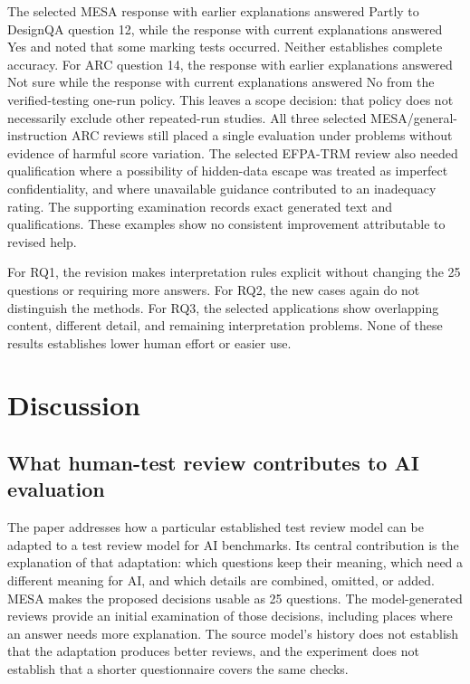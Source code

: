 \documentclass[10pt,conference]{IEEEtran}
\begin{document}
The selected MESA response with earlier explanations answered Partly to DesignQA question 12, while the response with current explanations answered Yes and noted that some marking tests occurred. Neither establishes complete accuracy. For ARC question 14, the response with earlier explanations answered Not sure while the response with current explanations answered No from the verified-testing one-run policy. This leaves a scope decision: that policy does not necessarily exclude other repeated-run studies. All three selected MESA/general-instruction ARC reviews still placed a single evaluation under problems without evidence of harmful score variation. The selected EFPA-TRM review also needed qualification where a possibility of hidden-data escape was treated as imperfect confidentiality, and where unavailable guidance contributed to an inadequacy rating. The supporting examination records exact generated text and qualifications. These examples show no consistent improvement attributable to revised help.

For RQ1, the revision makes interpretation rules explicit without changing the 25 questions or requiring more answers. For RQ2, the new cases again do not distinguish the methods. For RQ3, the selected applications show overlapping content, different detail, and remaining interpretation problems. None of these results establishes lower human effort or easier use.

\section{Discussion}
\subsection{What human-test review contributes to AI evaluation}
The paper addresses how a particular established test review model can be adapted to a test review model for AI benchmarks. Its central contribution is the explanation of that adaptation: which questions keep their meaning, which need a different meaning for AI, and which details are combined, omitted, or added. MESA makes the proposed decisions usable as 25 questions. The model-generated reviews provide an initial examination of those decisions, including places where an answer needs more explanation. The source model's history does not establish that the adaptation produces better reviews, and the experiment does not establish that a shorter questionnaire covers the same checks.
\end{document}
